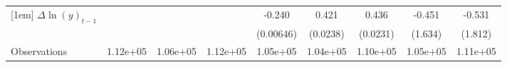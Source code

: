 {\begin{tabular}{l*{8}{c}}
[1em]
$\Delta \ln(y)_{t-1}$&                  &                  &                  &   -0.240\sym{***}&    0.421\sym{***}&    0.436\sym{***}&   -0.451         &   -0.531         \\
          &                  &                  &                  &(0.00646)         & (0.0238)         & (0.0231)         &  (1.634)         &  (1.812)         \\
\hline
Observations& 1.12e+05         & 1.06e+05         & 1.12e+05         & 1.05e+05         & 1.04e+05         & 1.10e+05         & 1.05e+05         & 1.11e+05         \\
\hline\hline
\end{tabular}
}
